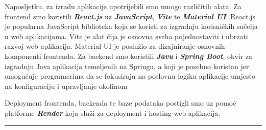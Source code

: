 			Naposljetku, za izradu aplikacije upotrijebili smo mnogo različitih alata. Za frontend smo koristili \textbf{\textit{React.js}} uz \textbf{\textit{JavaScript}}, \textbf{\textit{Vite}} te \textbf{\textit{Material UI}}. React.js je popularna JavaScript biblioteka koja se koristi za izgradnju korisničkih sučelja u web aplikacijama. Vite je alat čija je osnovna svrha pojednostaviti i ubrzati razvoj web aplikacija. Material UI je poslužio za dizajniranje osnovnih komponenti frontenda. Za backend smo koristili \textbf{\textit{Javu}} i \textbf{\textit{Spring Boot}}, okvir za izgradnju Java aplikacija temeljenih na Springu, a koji je posebno koristan jer omogućuje programerima da se fokusiraju na poslovnu logiku aplikacije umjesto na konfiguraciju i upravljanje okolinom
			
			Deployment frontenda, backenda te baze podataka postigli smo uz pomoć platforme \textbf{\textit{Render}} koja služi za deployment i hosting web aplikacija. 
			
			\par\noindent\rule{\textwidth}{0.4pt}
			
